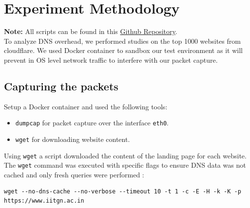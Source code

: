 \documentclass{article}
\begin{document}
\section{Experiment Methodology}
\textbf{Note:} All scripts can be found in this \hyperlink{https://github.com/SachinJalan/DNS-Renaissance/tree/main}{Github Repository}. \\
To analyze DNS overhead, we performed studies on the top 1000 websites from cloudflare. We used Docker container to sandbox our test environment as it will prevent in OS level network traffic to interfere with our packet capture.

\subsection{Capturing the packets}
Setup a Docker container and used the following tools:
\begin{itemize}
    \item \texttt{dumpcap} for packet capture over the interface \texttt{eth0}.
    \item \texttt{wget} for downloading website content.
\end{itemize}
Using \texttt{wget} a script downloaded the content of the landing page for each website. The \texttt{wget} command was executed with specific flags to ensure DNS data was not cached and only fresh queries were performed \cite{wget}:
\begin{verbatim}
wget --no-dns-cache --no-verbose --timeout 10 -t 1 -c -E -H -k -K -p https://www.iitgn.ac.in
\end{verbatim}
\end{document}
